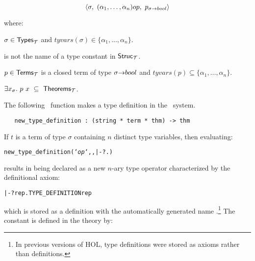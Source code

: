 \[ \langle \sigma,\ (\alpha_1,\ldots,\alpha_n)\ty{op},
    \ p_{\sigma\fun\ty{bool}}\rangle \]

\noindent where:

\begin{myenumerate}
\item $\sigma\in{\sf Types}_{\cal T}$  and
$tyvars(\sigma)\in\{\alpha_1, \ldots , \alpha_n\}$.
\item {} is not the name of a type constant in ${\sf Struc}_{\cal T}$.
\item $p\in{\sf Terms}_{\cal T}$ is a closed term of
type $\sigma{\to}{\sl bool}$  and
$tyvars(p)\subseteq\{\alpha_1, \ldots , \alpha_n\}$.
\item $\exists x_{\sigma}.\ p\ x \ \subseteq\ {\sf Theorems}_{\cal T}$.
\end{myenumerate}

The following \ML\ function makes a type definition in the \HOL\ system.

\begin{boxed}
\begin{verbatim}
   new_type_definition : (string * term * thm) -> thm
\end{verbatim}\end{boxed}

\noindent If $t$ is a term of type
$\sigma$ containing $n$ distinct type variables, then
evaluating:

{\def\op{{\normalsize\sl op}}
\begin{hol}\begin{alltt}
   new_type_definition(`{\op}`, , |- ?.)
\end{alltt}\end{hol}}

\noindent results in  being declared as a new $n$-ary type operator
characterized by the definitional axiom:

\begin{hol}\begin{alltt}
   |- ?rep. TYPE\_DEFINITION  rep
\end{alltt}\end{hol}

\noindent which is stored as a definition with the automatically
generated name
.\footnote{In
previous versions of HOL, type definitions
were stored as axioms rather than definitions.} The constant
is defined in the theory  by:

